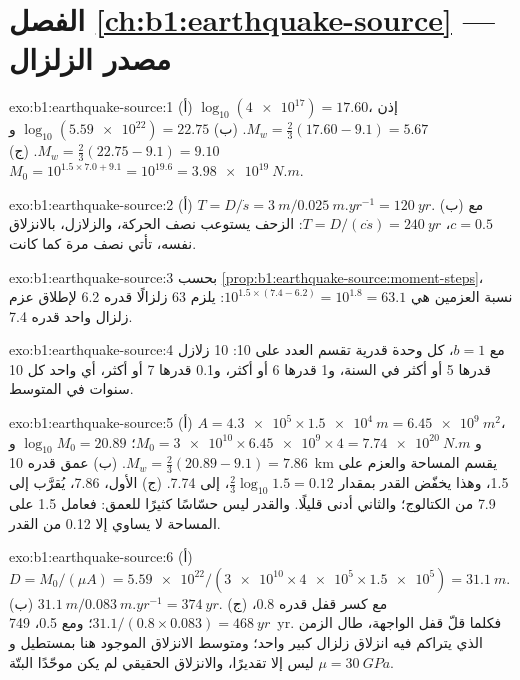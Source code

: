 \section*{الفصل \ref{ch:b1:earthquake-source} --- مصدر الزلزال}

\begin{solution}{exo:b1:earthquake-source:1}
(أ) $\log_{10}(\num{4e17}) = 17.60$، إذن $M_w = \tfrac23(17.60 - 9.1) = 5.67$.
(ب) $\log_{10}(\num{5.59e22}) = 22.75$ و$M_w = \tfrac23(22.75 - 9.1) =
9.10$. (ج) $M_0 = 10^{1.5\times7.0 + 9.1} = 10^{19.6} = \qty{3.98e19}{N.m}$.
\end{solution}

\begin{solution}{exo:b1:earthquake-source:2}
(أ) $T = D/\dot s = \qty{3}{m}/\qty{0.025}{m.yr^{-1}} = \qty{120}{yr}$.
(ب) مع $c = 0.5$، $T = D/(c\dot s) = \qty{240}{yr}$: الزحف يستوعب نصف الحركة، والزلازل، بالانزلاق نفسه، تأتي نصف مرة كما كانت.
\end{solution}

\begin{solution}{exo:b1:earthquake-source:3}
بحسب \cref{prop:b1:earthquake-source:moment-steps}، نسبة العزمين هي
$10^{1.5\times(7.4 - 6.2)} = 10^{1.8} = 63.1$: يلزم 63 زلزالًا قدره 6.2 لإطلاق عزم زلزال واحد قدره 7.4.
\end{solution}

\begin{solution}{exo:b1:earthquake-source:4}
مع $b = 1$، كل وحدة قدرية تقسم العدد على 10: 10 زلازل قدرها 5 أو أكثر في السنة، و\num{1} قدرها 6 أو أكثر، و\num{0.1} قدرها 7 أو أكثر، أي واحد كل 10 سنوات في المتوسط.
\end{solution}

\begin{solution}{exo:b1:earthquake-source:5}
(أ) $A = \num{4.3e5} \times \qty{1.5e4}{m} = \qty{6.45e9}{m^2}$، و
$M_0 = \num{3e10}\times\num{6.45e9}\times4 = \qty{7.74e20}{N.m}$؛
$\log_{10}M_0 = 20.89$ و$M_w = \tfrac23(20.89 - 9.1) = 7.86$. (ب) عمق قدره
\qty{10}{km} يقسم المساحة والعزم على 1.5، وهذا يخفّض القدر بمقدار
$\tfrac23\log_{10}1.5 = 0.12$، إلى 7.74. (ج) الأول، 7.86، يُقرَّب إلى 7.9 من الكتالوج؛ والثاني أدنى قليلًا. والقدر ليس حسّاسًا كثيرًا للعمق: فعامل 1.5 على المساحة لا يساوي إلا 0.12 من القدر.
\end{solution}

\begin{solution}{exo:b1:earthquake-source:6}
(أ) $D = M_0/(\mu A) = \num{5.59e22}/(\num{3e10}\times\num{4e5}\times\num{1.5e5})
= \qty{31.1}{m}$. (ب) $\qty{31.1}{m}/\qty{0.083}{m.yr^{-1}} = \qty{374}{yr}$.
(ج) مع كسر قفل قدره 0.8، $31.1/(0.8\times0.083) = \qty{468}{yr}$؛ ومع
0.5، \qty{749}{yr}. فكلما قلّ قفل الواجهة، طال الزمن الذي يتراكم فيه انزلاق زلزال كبير واحد؛ ومتوسط الانزلاق الموجود هنا بمستطيل  و$\mu = \qty{30}{GPa}$ ليس إلا تقديرًا، والانزلاق الحقيقي لم يكن موحّدًا البتّة.
\end{solution}

